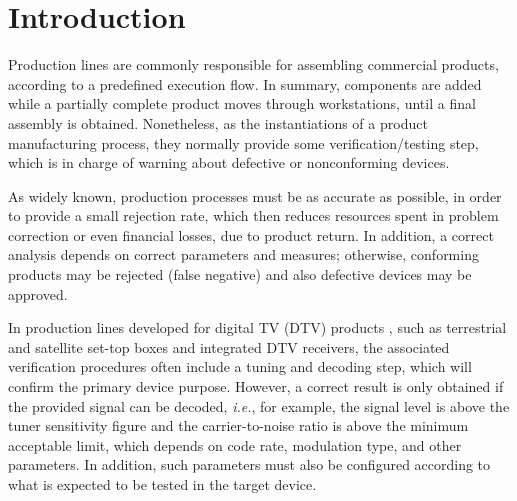 \documentclass[conference]{IEEEtran}
\begin{document}




%
\IEEEpeerreviewmaketitle



\section{Introduction}
\label{intro}

Production lines are commonly responsible for assembling commercial products, according to a predefined execution flow. In summary, components are added while a partially complete product moves through workstations, until a final assembly is obtained. Nonetheless, as the instantiations of a product manufacturing process, they normally provide some verification/testing step, which is in charge of warning about defective or nonconforming devices.

As widely known, production processes must be as accurate as possible, in order to provide a small rejection rate, which then reduces resources spent in problem correction or even financial losses, due to product return. In addition, a correct analysis depends on correct parameters and measures; otherwise, conforming products may be rejected (false negative) and also defective devices may be approved.

In production lines developed for digital TV (DTV) products \cite{keith}, such as terrestrial and satellite set-top boxes and integrated DTV receivers, the associated verification procedures often include a tuning and decoding step, which will confirm the primary device purpose. However, a correct result is only obtained if the provided signal can be decoded, {\it i.e.}, for example, the signal level is above the tuner sensitivity figure and the carrier-to-noise ratio is above the minimum acceptable limit, which depends on code rate, modulation type, and other parameters. In addition, such parameters must also be configured according to what is expected to be tested in the target device.%
\end{document}
